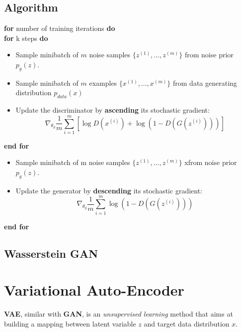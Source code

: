 \documentclass[a3paper, 12pt]{book} %
\begin{document}
\subsection{Algorithm}
\textbf{for} number of training iterations \textbf{do}\\
\indent \textbf{for} k steps \textbf{do} 
\begin{itemize}[leftmargin=+0.5in]
	\item Sample minibatch of $m$ noise samples $\{z^{(1)},..., z^{(m)}\}$ from noise prior $p_g{(z)}$.
	\item Sample minibatch of $m$ examples $\{x^{(1)},..., x^{(m)}\}$ from data generating distribution $p_{data}{(x)}$
	\item Update the discriminator by \textbf{ascending} its stochastic gradient:
	$$\nabla_{\theta_d}{\frac{1}{m}\sum_{i=1}^{m}{ [\log{D(x^{(i)})}+\log{(1-D(G(z^{(i)})))}]}}$$
\end{itemize}
\indent\indent \textbf{end for} 
\begin{itemize}
	\item Sample minibatch of m noise samples $\{z^{(1)},..., z^{(m)}\}$ xfrom noise prior $p_g{(z)}$.
	\item Update the generator by \textbf{descending} its stochastic gradient:
		$$\nabla_{\theta_g}{\frac{1}{m}\sum_{i=1}^{m}{\log{(1-D(G(z^{(i)})))}}}$$
\end{itemize}
\textbf{end for}
\subsection{Wasserstein GAN}

\section{Variational Auto-Encoder}
\textbf{VAE}, similar with \textbf{GAN}, is an \emph{unsupervised learning} method that aims at building a mapping between latent variable $z$ and target data distribution $x$. 
\end{document}

